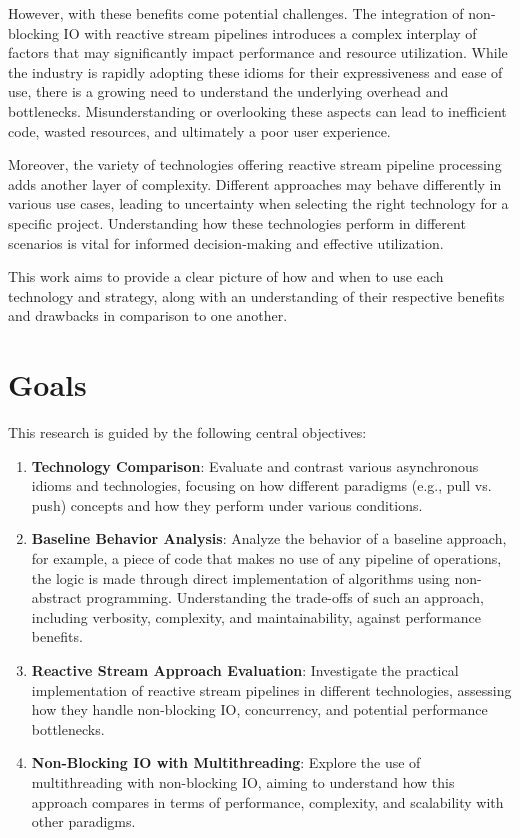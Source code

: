 However, with these benefits come potential challenges. The integration of non-blocking IO with reactive stream pipelines introduces a complex interplay of factors that may significantly impact performance and resource utilization. While the industry is rapidly adopting these idioms for their expressiveness and ease of use, there is a growing need to understand the underlying overhead and bottlenecks. Misunderstanding or overlooking these aspects can lead to inefficient code, wasted resources, and ultimately a poor user experience.

Moreover, the variety of technologies offering reactive stream pipeline processing adds another layer of complexity. Different approaches may behave differently in various use cases, leading to uncertainty when selecting the right technology for a specific project. Understanding how these technologies perform in different scenarios is vital for informed decision-making and effective utilization.

This work aims to provide a clear picture of how and when to use each technology and strategy, along with an understanding of their respective benefits and drawbacks in comparison to one another.


\section{Goals}
\label{sec:goals}
This research is guided by the following central objectives:

\begin{enumerate}
\item \textbf{Technology Comparison}: Evaluate and contrast various asynchronous idioms and technologies, focusing on how different paradigms (e.g., pull vs. push) concepts and how they perform under various conditions.

\item \textbf{Baseline Behavior Analysis}: Analyze the behavior of a baseline approach, for example, a piece of code that makes no use of any pipeline of operations, the logic is made through direct implementation of algorithms using non-abstract programming. Understanding the trade-offs of such an approach, including verbosity, complexity, and maintainability, against performance benefits.

\item \textbf{Reactive Stream Approach Evaluation}: Investigate the practical implementation of reactive stream pipelines in different technologies, assessing how they handle non-blocking IO, concurrency, and potential performance bottlenecks.

\item \textbf{Non-Blocking IO with Multithreading}: Explore the use of multithreading with non-blocking IO, aiming to understand how this approach compares in terms of performance, complexity, and scalability with other paradigms.

\end{enumerate}

